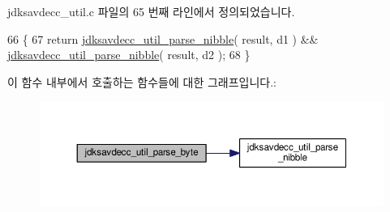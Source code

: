 jdksavdecc\+\_\+util.\+c 파일의 65 번째 라인에서 정의되었습니다.


\begin{DoxyCode}
66 \{
67     \textcolor{keywordflow}{return} \hyperlink{group__util_ga8e6b4707f16031adcb7ae2f983e908ee}{jdksavdecc\_util\_parse\_nibble}( result, d1 ) && 
      \hyperlink{group__util_ga8e6b4707f16031adcb7ae2f983e908ee}{jdksavdecc\_util\_parse\_nibble}( result, d2 );
68 \}
\end{DoxyCode}


이 함수 내부에서 호출하는 함수들에 대한 그래프입니다.\+:
\nopagebreak
\begin{figure}[H]
\begin{center}
\leavevmode
\includegraphics[width=350pt]{group__util_ga82a47aacd3de4b522a4ac6a52d72e17e_cgraph}
\end{center}
\end{figure}




